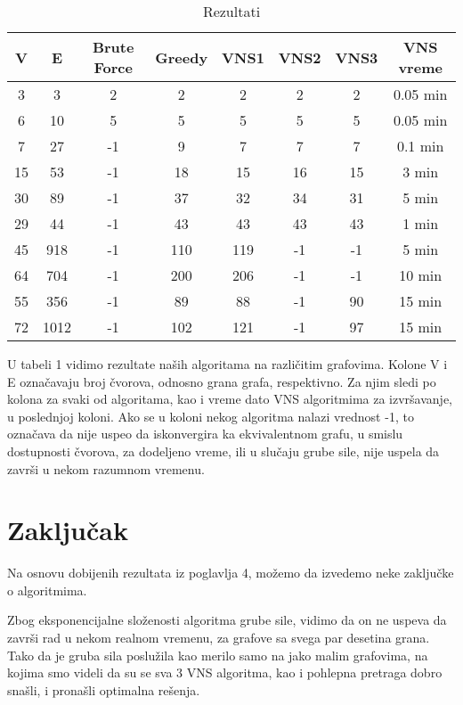\documentclass{article}
\begin{document}
\begin{table}[htbp]
\centering
\label{tab:my-table}
\begin{tabular}{|c|c|c|c|c|c|c|c|}
\hline
V & E & Brute Force & Greedy & VNS1 & VNS2 & VNS3 & VNS vreme \\
\hline
3 & 3 & 2 & 2 & 2 & 2 & 2 & 0.05 min\\
\hline
6 & 10 & 5 & 5 & 5 & 5 & 5 & 0.05 min\\
\hline
7 & 27 & -1 & 9 & 7 & 7 & 7 & 0.1 min\\
\hline
15 & 53 & -1 & 18 & 15 & 16 & 15 & 3 min\\
\hline
30 & 89 & -1 & 37 & 32 & 34 & 31 & 5 min \\
\hline
29 & 44 & -1 & 43 & 43 & 43 & 43 & 1 min \\
\hline
45 & 918 & -1 & 110 & 119 & -1 & -1 & 5 min\\
\hline
64 & 704 & -1 & 200 & 206 & -1 & -1 & 10 min\\
\hline
55 & 356 & -1 & 89 & 88 & -1 & 90 & 15 min \\
\hline
72 & 1012 & -1 & 102 & 121 & -1 & 97 & 15 min\\
\hline
\end{tabular}
\caption{Rezultati}
\end{table}

U tabeli 1 vidimo rezultate naših algoritama na različitim grafovima. Kolone V i E označavaju broj čvorova, odnosno grana grafa, respektivno. Za njim sledi po kolona za svaki od algoritama, kao i vreme dato VNS algoritmima za izvršavanje, u poslednjoj koloni. Ako se u koloni nekog algoritma nalazi vrednost -1, to označava da nije uspeo da iskonvergira ka ekvivalentnom grafu, u smislu dostupnosti čvorova, za dodeljeno vreme, ili u slučaju grube sile, nije uspela da završi u nekom razumnom vremenu.


\newpage

\section{\huge Zaključak}\label{sec:zak}
Na osnovu dobijenih rezultata iz poglavlja 4, možemo da izvedemo neke zaključke o algoritmima.
\newline

Zbog eksponencijalne složenosti algoritma grube sile, vidimo da on ne uspeva da završi rad u nekom realnom vremenu, za grafove sa svega par desetina grana. Tako da je gruba sila poslužila kao merilo samo na jako malim grafovima, na kojima smo videli da su se sva 3 VNS algoritma, kao i pohlepna pretraga dobro snašli, i pronašli optimalna rešenja.
\newline
\end{document}
